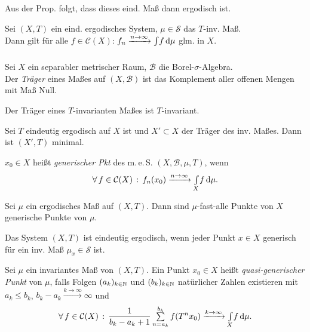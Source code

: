 \documentclass{cheat-sheet}
\newcommand{\Bor}{\mathcal{B}} %
\newcommand{\meS}{m.\,e.\,S.} %
\newcommand{\meST}{$(X, \Bor, \mu, T)$} %
\newcommand{\Cont}{\mathcal{C}} %
\begin{document}
\begin{bem}
  Aus der Prop. folgt, dass dieses eind. Maß dann ergodisch ist.
\end{bem}

\begin{thm}
  Sei $(X, T)$ ein eind. ergodisches System, $\mu \!\in\! \mathcal{S}$ das $T$-inv. Maß. \\
  Dann gilt für alle $f \in \Cont(X)$: $f_n \xrightarrow{n \to \infty} {\textstyle \int\limits_{}^{}} f \,\mathrm{d} \mu$ glm. in $X$.
\end{thm}

\begin{defn}
  Sei $X$ ein separabler metrischer Raum, $\Bor$ die Borel-$\sigma$-Algebra. \\
  Der \emph{Träger} eines Maßes auf $(X, \Bor)$ ist das Komplement aller offenen Mengen mit Maß Null.
\end{defn}

\begin{bem}
  Der Träger eines $T$-invarianten Maßes ist $T$-invariant.
\end{bem}

\begin{prop}
  Sei $T$ eindeutig ergodisch auf $X$ ist und $X' \subset X$ der Träger des inv. Maßes. Dann ist $(X', T)$ minimal.
\end{prop}

\begin{defn}
  $x_0 \!\in\! X$ heißt \emph{generischer Pkt} des \meS{} \meST{}, wenn
  \[ \fa{f \in \Cont(X)} f_n(x_0) \xrightarrow{n \to \infty} \Int{X}{}{f}{\mu}. \]
\end{defn}

\begin{prop}
  Sei $\mu$ ein ergodisches Maß auf $(X, T)$. Dann sind $\mu$-fast-alle Punkte von $X$ generische Punkte von $\mu$.
\end{prop}

\begin{prop}
  Das System $(X, T)$ ist eindeutig ergodisch, wenn jeder Punkt $x \in X$ generisch für ein inv. Maß $\mu_x \in \mathcal{S}$ ist.
\end{prop}


\begin{defn}
  Sei $\mu$ ein invariantes Maß von $(X, T)$. Ein Punkt $x_0 \in X$ heißt \emph{quasi-generischer Punkt} von $\mu$, falls Folgen $(a_k)_{k \in \mathbb{N}}$ und $(b_k)_{k \in \mathbb{N}}$ natürlicher Zahlen existieren mit $a_k \leq b_k$, \enspace $b_k - a_k \xrightarrow{k \to \infty} \infty$ und
  \[ \fa{f \in \Cont(X)} \frac{1}{b_k - a_k + 1} \sum_{n=a_k}^{b_k} f(T^n x_0) \xrightarrow{k \to \infty} \Int{X}{}{f}{\mu}. \]
\end{defn}
\end{document}
